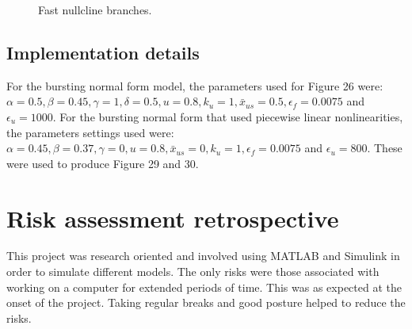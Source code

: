 \documentclass[a4paper, 12pt]{article}
\begin{document}
\begin{appendices}
\begin{figure}[h!]
{
  }
\caption{Fast nullcline branches.}
\end{figure}

\subsection{Implementation details}
For the bursting normal form model, the parameters used for Figure 26 were: $\alpha = 0.5, \beta = 0.45, \gamma = 1, \delta = 0.5, u = 0.8,k_u = 1, \bar{x}_{us} = 0.5, \epsilon_f = 0.0075$ and $\epsilon_u = 1000$.
For the bursting normal form that used piecewise linear nonlinearities, the parameters settings used were: $\alpha = 0.45, \beta = 0.37, \gamma = 0, u = 0.8, \bar{x}_{us} = 0,k_u = 1, \epsilon_f = 0.0075$ and $\epsilon_u = 800$. These were used to produce Figure 29 and 30. 


\section{Risk assessment retrospective}
This project was research oriented and involved using MATLAB and Simulink in order to simulate different models. The only risks were those associated with working on a computer for extended periods of time. This was as expected at the onset of the project. Taking regular breaks and good posture helped to reduce the risks.

\end{appendices}
\end{document}

